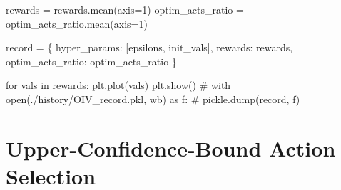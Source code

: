 \documentclass[
  letterpaper,
]{krantz}
\makeatletter
\newenvironment{Shaded}{\begin{snugshade}}{\end{snugshade}}
\newcommand{\CommentTok}[1]{\textcolor[rgb]{0.37,0.37,0.37}{#1}}
\newcommand{\ControlFlowTok}[1]{\textcolor[rgb]{0.00,0.23,0.31}{#1}}
\newcommand{\DecValTok}[1]{\textcolor[rgb]{0.68,0.00,0.00}{#1}}
\newcommand{\KeywordTok}[1]{\textcolor[rgb]{0.00,0.23,0.31}{#1}}
\newcommand{\NormalTok}[1]{\textcolor[rgb]{0.00,0.23,0.31}{#1}}
\newcommand{\OperatorTok}[1]{\textcolor[rgb]{0.37,0.37,0.37}{#1}}
\newcommand{\StringTok}[1]{\textcolor[rgb]{0.13,0.47,0.30}{#1}}
\newenvironment{kframe}{%
\medskip{}
\setlength{\fboxsep}{.8em}
 \def\at@end@of@kframe{}%
 \ifinner\ifhmode%
  \def\at@end@of@kframe{\end{minipage}}%
  \begin{minipage}{\columnwidth}%
 \fi\fi%
 \def\FrameCommand##1{\hskip\@totalleftmargin \hskip-\fboxsep
 \colorbox{shadecolor}{##1}\hskip-\fboxsep
     \hskip-\linewidth \hskip-\@totalleftmargin \hskip\columnwidth}%
 \MakeFramed {\advance\hsize-\width
   \@totalleftmargin\z@ \linewidth\hsize
   \@setminipage}}%
 {\par\unskip\endMakeFramed%
 \at@end@of@kframe}
\renewenvironment{Shaded}{\begin{kframe}}{\end{kframe}}
\theoremstyle{plain}
\theoremstyle{definition}
\theoremstyle{definition}
\theoremstyle{remark}
\makeatother
\begin{document}
\begin{codelisting}
\begin{Shaded}
\begin{Highlighting}[]
\NormalTok{    rewards }\OperatorTok{=}\NormalTok{ rewards.mean(axis}\OperatorTok{=}\DecValTok{1}\NormalTok{)}
\NormalTok{    optim\_acts\_ratio }\OperatorTok{=}\NormalTok{ optim\_acts\_ratio.mean(axis}\OperatorTok{=}\DecValTok{1}\NormalTok{)}

\NormalTok{    record }\OperatorTok{=}\NormalTok{ \{}
        \StringTok{\textquotesingle{}hyper\_params\textquotesingle{}}\NormalTok{: [epsilons, init\_vals], }
        \StringTok{\textquotesingle{}rewards\textquotesingle{}}\NormalTok{: rewards,}
        \StringTok{\textquotesingle{}optim\_acts\_ratio\textquotesingle{}}\NormalTok{: optim\_acts\_ratio}
\NormalTok{    \}}

    \ControlFlowTok{for}\NormalTok{ vals }\KeywordTok{in}\NormalTok{ rewards:}
\NormalTok{        plt.plot(vals)}
\NormalTok{    plt.show()}
    \CommentTok{\# with open(\textquotesingle{}./history/OIV\_record.pkl\textquotesingle{}, \textquotesingle{}wb\textquotesingle{}) as f:}
    \CommentTok{\#     pickle.dump(record, f)}
\end{Highlighting}
\end{Shaded}

\end{codelisting}

\section{Upper-Confidence-Bound Action
Selection}\label{upper-confidence-bound-action-selection}
\end{document}
